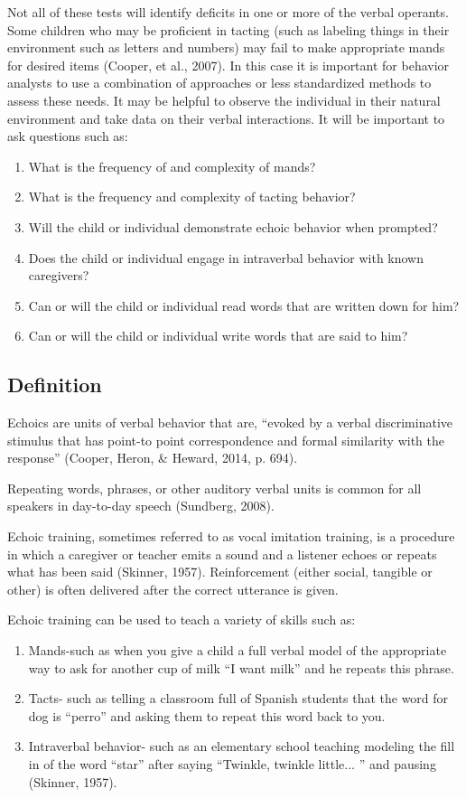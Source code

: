 Not all of these tests will identify deficits in one or more of the verbal operants. Some children who may be proficient in tacting (such as labeling things in their environment such as letters and numbers) may fail to make appropriate mands for desired items (Cooper, et al., 2007).  In this case it is important for behavior analysts to use a combination of approaches or less standardized methods to assess these needs.  It may be helpful to observe the individual in their natural environment and take data on their verbal interactions.  It will be important to ask questions such as:
\begin{enumerate}
\item What is the frequency of and complexity of mands?
\item What is the frequency and complexity of tacting behavior?
\item Will the child or individual demonstrate echoic behavior when prompted?
\item Does the child or individual engage in intraverbal behavior with known caregivers?
\item Can or will the child or individual read words that are written down for him?
\item Can or will the child or individual write words that are said to him? 
\end{enumerate}
%
\subsection{Definition} 
Echoics are units of verbal behavior that are, ``evoked by a verbal discriminative stimulus that has point-to point correspondence and formal similarity with the response'' (Cooper, Heron, \& Heward, 2014, p. 694).  

Repeating words, phrases, or other auditory verbal units is common for all speakers in day-to-day speech (Sundberg, 2008).

Echoic training, sometimes referred to as vocal imitation training, is a procedure in which a caregiver or teacher emits a sound and a listener echoes or repeats what has been said (Skinner, 1957).  Reinforcement (either social, tangible or other) is often delivered after the correct utterance is given.  

Echoic training can be used to teach a variety of skills such as:
\begin{enumerate}
\item Mands-such as when you give a child a full verbal model of the appropriate way to ask for another cup of milk ``I want milk'' and he repeats this phrase.
\item Tacts- such as telling a classroom full of Spanish students that the word for dog is ``perro'' and asking them to repeat this word back to you.
\item Intraverbal behavior- such as an elementary school teaching modeling the fill in of the word ``star'' after saying ``Twinkle, twinkle little... '' and pausing (Skinner, 1957).
\end{enumerate}

